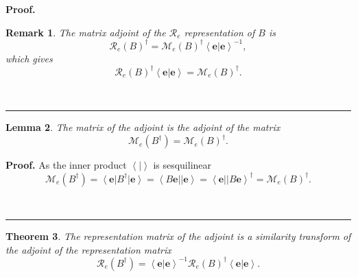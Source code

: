 \documentclass[aps,preprint]{revtex4}%
\newtheorem{theorem}{Theorem}
\newtheorem{lemma}[theorem]{Lemma}
\newtheorem{remark}[theorem]{Remark}
\newenvironment{proof}[1][Proof]{\noindent\textbf{#1.} }{\ \rule{0.5em}{0.5em}}
\begin{document}
\begin{proof}
\begin{remark}
The matrix adjoint of the $\mathcal{R}_{e}$ representation of $B$ is
\begin{equation}
\mathcal{R}_{e}\left(  B\right)  ^{\dagger}=\mathcal{M}_{e}\left(  B\right)
^{\dagger}\left\langle \left.  \mathbf{e}\right\vert \mathbf{e}\right\rangle
^{-1},
\end{equation}
which gives%
\begin{equation}
\mathcal{R}_{e}\left(  B\right)  ^{\dagger}\left\langle \left.  \mathbf{e}%
\right\vert \mathbf{e}\right\rangle =\mathcal{M}_{e}\left(  B\right)
^{\dagger}.
\end{equation}

\end{remark}
\end{proof}

\begin{lemma}
The \emph{matrix} of the adjoint is the adjoint of the matrix
\begin{equation}
\mathcal{M}_{e}\left(  B^{\dagger}\right)  =\mathcal{M}_{e}\left(  B\right)
^{\dagger}.
\end{equation}

\end{lemma}

\begin{proof}
As the inner product $\left\langle \left.  {}\right\vert \right\rangle $ is
sesquilinear
\begin{equation}
\mathcal{M}_{e}\left(  B^{\dagger}\right)  =\left\langle \mathbf{e}\right\vert
B^{\dagger}\left\vert \mathbf{e}\right\rangle =\left\langle B\mathbf{e}%
\right\vert \left\vert \mathbf{e}\right\rangle =\left\langle \mathbf{e}%
\right\vert \left\vert B\mathbf{e}\right\rangle ^{\dagger}=\mathcal{M}%
_{e}\left(  B\right)  ^{\dagger}.
\end{equation}

\end{proof}

\begin{theorem}
The representation matrix of the adjoint is a similarity transform of the
adjoint of the representation matrix
\begin{equation}
\mathcal{R}_{e}\left(  B^{\dagger}\right)  =\left\langle \left.
\mathbf{e}\right\vert \mathbf{e}\right\rangle ^{-1}\mathcal{R}_{e}\left(
B\right)  ^{\dagger}\left\langle \left.  \mathbf{e}\right\vert \mathbf{e}%
\right\rangle .
\end{equation}

\end{theorem}
\end{document}
